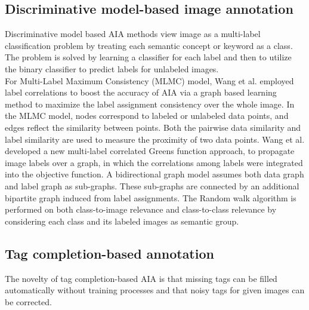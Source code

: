 \documentclass[conference]{IEEEtran}
\begin{document}
	\subsection{Discriminative model-based image annotation}

		Discriminative model based AIA methods view image as a multi-label classification problem
by treating each semantic concept or keyword as a class. The problem is solved by learning a
classifier for each label and then to utilize the binary classifier to predict labels for unlabeled
images.\\
		
		For Multi-Label Maximum Consistency (MLMC) model, Wang et al.\cite{MLMC} employed
 label correlations to boost the accuracy of AIA via a graph based learning method to
maximize the label assignment consistency over the whole image. In the MLMC model,
nodes correspond to labeled or unlabeled data points, and edges reflect the similarity
between points. Both the pairwise data similarity and label similarity are used to measure
the proximity of two data points. Wang et al.\cite{Wang} developed a new multi-label correlated
Greens function approach, to propagate image labels over a graph, in which the correlations
among labels were integrated into the objective function. A bidirectional graph model
assumes both data graph and label graph as sub-graphs. These sub-graphs are connected by
an additional bipartite graph induced from label assignments. The Random walk algorithm
is performed on both class-to-image relevance and class-to-class relevance by considering
each class and its labeled images as semantic group.


	\subsection{Tag completion-based annotation}

		The novelty of tag completion-based AIA is that missing tags can be filled automatically
without training processes and that noisy tags for given images can be corrected.\\
		
\end{document}
